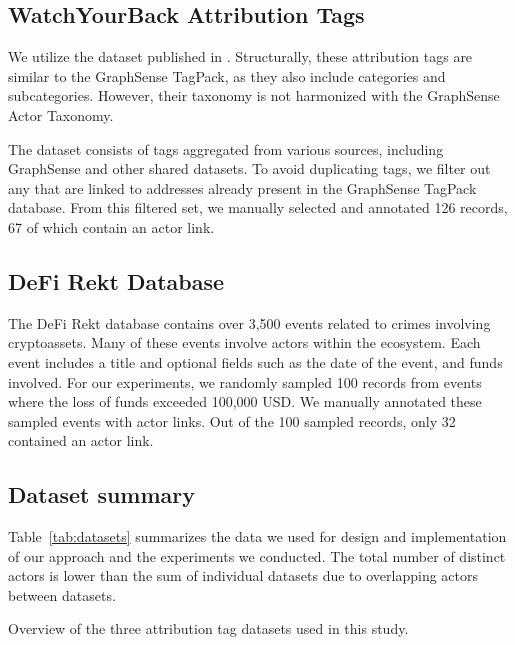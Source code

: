 \subsection{WatchYourBack Attribution Tags}
\label{subsec:data_wyb}

We utilize the dataset published in \cite{Gomez2022}. Structurally, these attribution tags are similar to the GraphSense TagPack, as they also include categories and subcategories. However, their taxonomy is not harmonized with the GraphSense Actor Taxonomy.

The dataset consists of tags aggregated from various sources, including GraphSense and other shared datasets. To avoid duplicating tags, we filter out any that are linked to addresses already present in the GraphSense TagPack database. From this filtered set, we manually selected and annotated 126 records, 67 of which contain an actor link.

\subsection{DeFi Rekt Database}
\label{subsec:data_defirekt}

The DeFi Rekt database \cite{Defirekt2024} contains over 3,500 events related to crimes involving cryptoassets. Many of these events involve actors within the ecosystem. Each event includes a title and optional fields such as the date of the event, and funds involved. For our experiments, we randomly sampled 100 records from events where the loss of funds exceeded 100,000 USD. We manually annotated these sampled events with actor links. Out of the 100 sampled records, only 32 contained an actor link.

\subsection{Dataset summary}
\label{subsec:data_summary}

Table~\ref{tab:datasets} summarizes the data we used for design and implementation of our approach and the experiments we conducted. The total number of distinct actors is lower than the sum of individual datasets due to overlapping actors between datasets.

\begin{table}
    \centering
    \caption{Overview of the three attribution tag datasets used in this study.}
    
    \label{tab:datasets}
\end{table}

